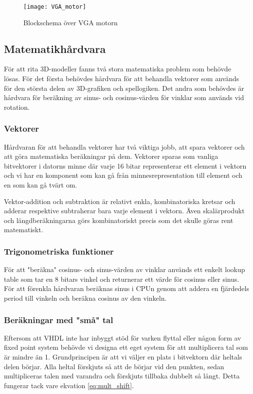 \documentclass[a4paper]{article}
\begin{document}
    \begin{figure}[H]
        \centering
        \texttt{[image: VGA\_motor]}
        \caption{Blockschema över VGA motorn}
        \label{fig:VGA_motor}
    \end{figure}

    \subsection{Matematikhårdvara}
    För att rita 3D-modeller fanns två stora matematiska problem som behövde
    lösas. För det första behövdes hårdvara för att behandla vektorer som
    används för den största delen av 3D-grafiken och spellogiken. Det andra som
    behövdes är hårdvara för beräkning av sinus- och cosinus-värden för vinklar som
    används vid rotation.
    
    \subsubsection{Vektorer}
    Hårdvaran för att behandla vektorer har två viktiga jobb, att spara vektorer
    och att göra matematiska beräkningar på dem. Vektorer sparas som vanliga
    bitvektorer i datorns minne där varje 16 bitar representerar ett element i
    vektorn och vi har en komponent som kan gå från minnesrepresentation till
    element och en som kan gå tvärt om. 

    Vektor-addition och subtraktion är relativt enkla, kombinatoriska kretsar
    och adderar respektive
    subtraherar bara varje element i vektorn. Även skalärprodukt och
    längdberäkningarna görs kombinatoriskt precis som det skulle göras rent
    matematiskt. 

    \subsubsection{Trigonometriska funktioner}
    För att "beräkna" cosinus- och sinus-värden av vinklar används ett enkelt lookup
    table som tar en 8 bitars vinkel och returnerar ett värde för cosinus eller
    sinus. För att förenkla hårdvaran beräknas sinus i CPUn genom att addera en
    fjärdedels period till vinkeln och beräkna cosinus av den vinkeln. 

    \subsubsection{Beräkningar med "små" tal}
    Eftersom att VHDL inte har inbyggt stöd för varken flyttal eller någon form
    av fixed point system behövde vi designa ett eget system för att
    multiplicera tal som är mindre än 1. Grundprincipen är att vi väljer en
    plats i bitvektorn där heltals delen börjar. Alla heltal förskjuts så att de
    börjar vid den punkten, sedan multipliceras talen med varandra och förskjuts
    tillbaka dubbelt så långt. Detta fungerar tack vare ekvation
    \ref{eq:mult_shift}.
\end{document}
